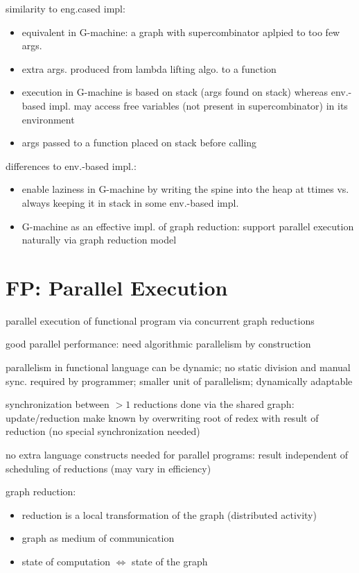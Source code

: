 \documentclass[8pt]{extarticle}
\begin{document}
\begin{multicols*}{2}
similarity to eng.cased impl:
\begin{itemize}
\item equivalent in G-machine: a graph with supercombinator aplpied to too few args.
\item extra args. produced from lambda lifting algo. to a function
\item execution in G-machine is based on stack (args found on stack) whereas env.-based impl. may access free variables (not present in supercombinator) in its environment
\item args passed to a function placed on stack before calling 
\end{itemize}

differences to env.-based impl.:
\begin{itemize}
\item enable laziness in G-machine by writing the spine into the heap at ttimes vs. always keeping it in stack in some env.-based impl.
\item G-machine as an effective impl. of graph reduction: support parallel execution naturally via graph reduction model
\end{itemize}

\vfill\null
\columnbreak

\section{FP: Parallel Execution}

parallel execution of functional program via concurrent graph reductions

good parallel performance: need algorithmic parallelism by construction

parallelism in functional language can be dynamic; no static division and manual sync. required by programmer; smaller unit of parallelism; dynamically adaptable

synchronization between $>1$ reductions done via the shared graph: update/reduction make known by overwriting root of redex with result of reduction (no special synchronization needed)

no extra language constructs needed for parallel programs: result independent of scheduling of reductions (may vary in efficiency)

graph reduction:
\begin{itemize}
\item reduction is a local transformation of the graph (distributed activity)
\item graph as medium of communication
\item state of computation $\iff$ state of the graph
\end{itemize}


\end{multicols*}
\end{document}
